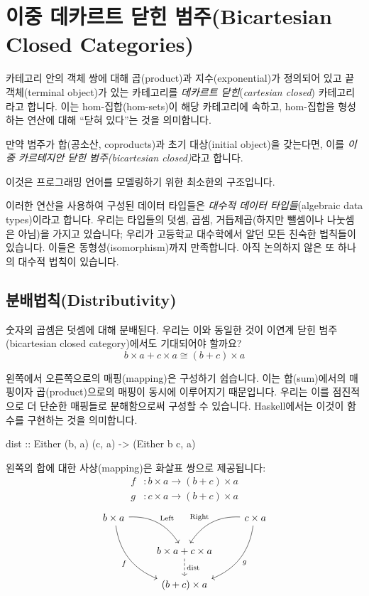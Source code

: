 \documentclass[DaoFP]{subfiles}
\begin{document}
\section{이중 데카르트 닫힌 범주(Bicartesian Closed Categories)}

카테고리 안의 객체 쌍에 대해 곱(product)과 지수(exponential)가 정의되어 있고 끝 객체(terminal object)가 있는 카테고리를 \emph{데카르트 닫힌}(\emph{cartesian closed}) 카테고리라고 합니다. 이는 hom-집합(hom-sets)이 해당 카테고리에 속하고, hom-집합을 형성하는 연산에 대해 ``닫혀 있다''는 것을 의미합니다.

만약 범주가 합(공소산, coproduc​ts)과 초기 대상(initial object)을 갖는다면, 이를 \emph{이중 카르테지안 닫힌 범주(bicartesian closed)}라고 합니다.

이것은 프로그래밍 언어를 모델링하기 위한 최소한의 구조입니다.

이러한 연산을 사용하여 구성된 데이터 타입들은 \emph{대수적 데이터 타입들}(algebraic data types)이라고 합니다. 우리는 타입들의 덧셈, 곱셈, 거듭제곱(하지만 뺄셈이나 나눗셈은 아님)을 가지고 있습니다; 우리가 고등학교 대수학에서 알던 모든 친숙한 법칙들이 있습니다. 이들은 동형성(isomorphism)까지 만족합니다. 아직 논의하지 않은 또 하나의 대수적 법칙이 있습니다.

\subsection{분배법칙(Distributivity)}

숫자의 곱셈은 덧셈에 대해 분배된다. 우리는 이와 동일한 것이 이연계 닫힌 범주(bicartesian closed category)에서도 기대되어야 할까요?
\[b \times a + c \times a \cong (b + c) \times a\]

왼쪽에서 오른쪽으로의 매핑(mapping)은 구성하기 쉽습니다. 이는 합(sum)에서의 매핑이자 곱(product)으로의 매핑이 동시에 이루어지기 때문입니다. 우리는 이를 점진적으로 더 단순한 매핑들로 분해함으로써 구성할 수 있습니다. Haskell에서는 이것이 함수를 구현하는 것을 의미합니다.
\begin{haskell}
dist :: Either (b, a) (c, a) -> (Either b c, a)
\end{haskell}
왼쪽의 합에 대한 사상(mapping)은 화살표 쌍으로 제공됩니다:
\begin{align*}
f &\colon b\times a \to (b + c) \times a \\
g &\colon c\times a \to (b + c) \times a 
\end{align*}
\[
 \begin{tikzcd}
 b \times a
 \arrow[dr,  bend left, "\text{Left}"]
 \arrow[ddr, bend right, "f"']
 && c \times a
 \arrow[dl, bend right, "\text{Right}"']
 \arrow[ddl, bend left, "g"]
 \\
& b \times a + c \times a
\arrow[d, dashed, "\text{dist}"]
\\
& (b + c) \times a
 \end{tikzcd}
\]
\end{document}
